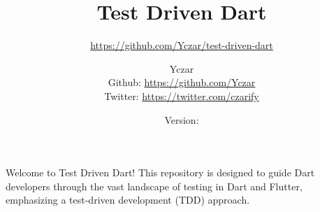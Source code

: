 \documentclass[11pt,twoside=semi,openright,numbers=noenddot]{scrartcl}
\title{Test Driven Dart}
\subtitle{\url{https://github.com/Yczar/test-driven-dart}}
\author{
    \huge{Yczar}\\
    Github: \url{https://github.com/Yczar}\\
    Twitter: \url{https://twitter.com/czarify}
    }
\date{Version: \tddversion}
\begin{document}
\baselineskip24pt
\maketitle

Welcome to Test Driven Dart! This repository is designed to guide Dart developers through the vast landscape of testing in Dart and Flutter, emphasizing a test-driven development (TDD) approach.

\tableofcontents

\newpage


\end{document}
